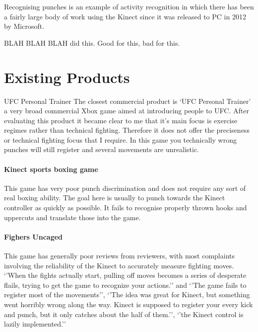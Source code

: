 Recognising punches is an example of activity recognition in which there has been a fairly large body of work using the Kinect since it was released to PC in 2012 by Microsoft. 

BLAH BLAH BLAH did this. Good for this, bad for this.



















\section{Existing Products}
\par{UFC Personal Trainer}
The closest commercial product is `UFC Personal Trainer' a very broad commercial Xbox game aimed at introducing people to UFC. After evaluating this product it became clear to me that it’s main focus is  exercise regimes rather than technical fighting. Therefore it does not offer the preciseness or technical fighting focus that I require. In this game you technically wrong punches will still register and several movements are unrealistic.

\paragraph{Kinect sports boxing game}
This game has very poor punch discrimination and does not require any sort of real boxing ability. The goal here is usually to punch towards the Kinect controller as quickly as possible. It fails to recognise properly thrown hooks and uppercuts and translate those into the game. 

\paragraph{Fighers Uncaged}
This game has generally poor reviews from reviewers, with most complaints involving the reliability of the Kinect to accurately measure fighting moves. \cite{gamerev1} `'When the fights actually start, pulling off moves becomes a series of desperate flails, trying to get the game to recognize your actions.''\cite{gamerev2} 
and `'The game fails to register most of the movements'', `'The idea was great for Kinect, but something went horribly wrong along the way. Kinect is supposed to register your every kick and punch, but it only catches about the half of them.'', `'the Kinect control is lazily implemented.''\cite{gamerev3} \newline

